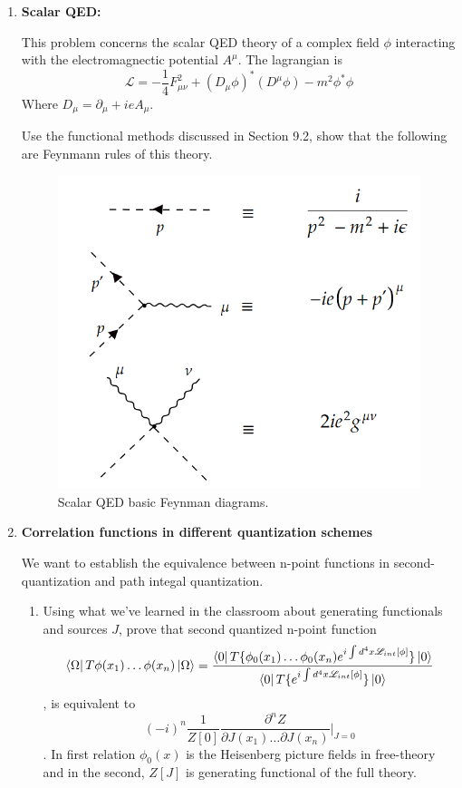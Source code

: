 \documentclass[11pt]{article}
\begin{document}
	\begin{enumerate}
	\item
	\begin{problem}{}
		\textbf{Scalar QED:} 
		
		\noindent
		This problem concerns the scalar QED theory of a complex field $\phi$ interacting with the electromagnectic potential $A^\mu$. The lagrangian is 
		\[
		\mathscr{L} = -\frac14 F_{\mu\nu}^2 + (D_\mu \phi)^{*} (D^\mu\phi) - m^2\phi^{*}\phi
		\]
		Where $D_\mu = \partial_\mu + ieA_\mu$.
		
		\noindent
		Use the functional methods discussed in Section 9.2, show that the following are Feynmann rules of this theory.
		
		\begin{figure}[H]
			\centering
			\includegraphics[width=0.5\linewidth]{img/1.png}
			\caption{Scalar QED basic Feynman diagrams.}
		\end{figure}
	\end{problem}
	\item
	\begin{problem}{\points{-}}
		\textbf{Correlation functions in different quantization schemes}
		
		\noindent
		 We want to establish the equivalence between n-point functions in second-quantization and path integal quantization.
		 
		\noindent
		\begin{enumerate}
			\item 
			Using what we've learned in the classroom about generating functionals and sources $J$, prove that second quantized n-point function 
			\[
			\bra{\Omega} T{\phi(x_1) \dots \phi(x_n)} \ket{\Omega} = \frac{
		\bra{0} T\{\phi_0(x_1) \dots \phi_0(x_n) e^{i\int d^4x \mathscr{L}_{int}[\phi]}\}\ket{0}	
		}{
\bra{0} T\{ e^{i\int d^4x \mathscr{L}_{int}[\phi]}\}\ket{0}		
}
			\],
			is equivalent to 
			\[
			(-i)^n \frac{1}{Z[0]} \frac{\partial^n Z}{\partial J(x_1) \dots \partial J(x_n)} \Big|_{J=0}
			\].
			In first relation $\phi_0(x)$ is the Heisenberg picture fields in free-theory and in the second, $Z[J]$ is generating functional of the full theory.
			

\end{enumerate}
\end{problem}
\end{enumerate}
\end{document}

